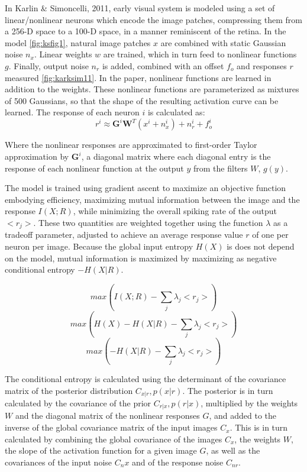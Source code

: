 \documentclass{article}
\begin{document}
In Karlin \& Simoncelli, 2011, early visual system is modeled \cite{karklin2011} using a set of linear/nonlinear neurons which encode the image patches, compressing them from a 256-D space to a 100-D space, in a manner reminiscent of the retina. In the model  \ref{fig:ksfig1}, natural image patches $x$ are combined with static Gaussian noise $n_x$. Linear weights $w$ are trained, which in turn feed to nonlinear functions $g$. Finally, output noise $n_r$ is added, combined with an offset $f_o$ and responses $r$ measured \ref{fig:karksim11}. In the paper, nonlinear functions are learned in addition to the weights. These nonlinear functions are parameterized as mixtures of 500 Gaussians, so that the shape of the resulting activation curve can be learned. The response of each neuron $i$ is calculated as:
$$r^i \approx \textbf{G}^i \textbf{W}^T (x^i+n_x^i)+n_r^i + f_o^i$$




Where the nonlinear responses are approximated to first-order Taylor approximation by $\textbf{G}^i$, a diagonal matrix where each diagonal entry is the response of each nonlinear function at the output $y$ from the filters $W$,  $g(y)$. \par
The model is trained using gradient ascent to maximize an objective function embodying efficiency, maximizing mutual information between the image and the response $I(X;R)$, while minimizing the overall spiking rate of the output $<r_j>$. These two quantities are weighted together using the function $\lambda$ as a tradeoff parameter, adjusted to achieve an average response value $r$ of one per neuron per image. Because the global input entropy $H(X)$ is does not depend on the model, mutual information is maximized by maximizing as negative conditional entropy $-H(X|R)$. \par


$$ max(I(X;R) - \sum_j{\lambda_j <r_j>}) $$
$$ max(H(X)-H(X|R) - \sum_j{\lambda_j <r_j>}) $$
$$ max(-H(X|R) - \sum_j{\lambda_j <r_j>}) $$


The conditional entropy is calculated using the determinant of the covariance matrix  of the posterior distribution $C_{x|r}, p(x|r)$. The posterior is in turn calculated by the covariance of the prior $C_{r|x}, p(r|x)$, multiplied by the weights $W$ and the diagonal matrix of the nonlinear responses $G$, and added to the inverse of the global covariance matrix of the input images $C_x$. This is in turn calculated by combining the global covariance of the images $C_x$, the weights $W$, the slope of the activation function for a given image $G$, as well as the covariances of the input noise $C_nx$ and of the response noise $C_{nr}$. \par
\end{document}
